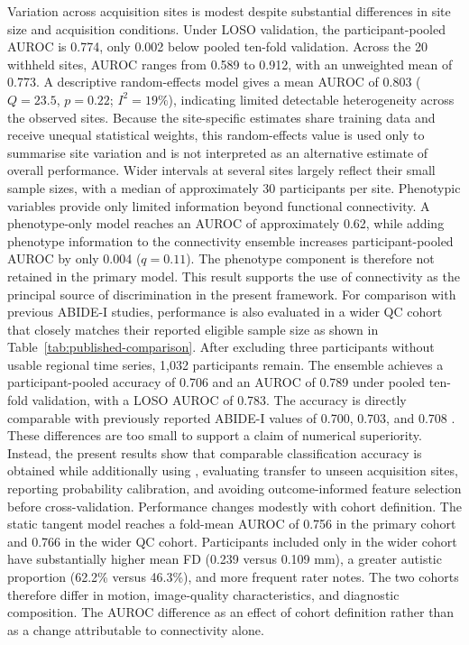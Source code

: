 Variation across acquisition sites is modest despite substantial differences in site size and acquisition conditions. Under LOSO validation, the participant-pooled AUROC is 0.774, only 0.002 below pooled ten-fold validation. Across the 20 withheld sites, AUROC ranges from 0.589 to 0.912, with an unweighted mean of 0.773. A descriptive random-effects model gives a mean AUROC of 0.803 ($Q=23.5$, $p=0.22$; $I^2=19\%$), indicating limited detectable heterogeneity across the observed sites. Because the site-specific estimates share training data and receive unequal statistical weights, this random-effects value is used only to summarise site variation and is not interpreted as an alternative estimate of overall performance. Wider intervals at several sites largely reflect their small sample sizes, with a median of approximately 30 participants per site. Phenotypic variables provide only limited information beyond functional connectivity. A phenotype-only model reaches an AUROC of approximately 0.62, while adding phenotype information to the connectivity ensemble increases participant-pooled AUROC by only 0.004 ($q=0.11$). The phenotype component is therefore not retained in the primary model. This result supports the use of connectivity as the principal source of discrimination in the present framework. For comparison with previous ABIDE-I studies, performance is also evaluated in a wider QC cohort that closely matches their reported eligible sample size as shown in Table~\ref{tab:published-comparison}. After excluding three participants without usable regional time series, 1,032 participants remain. The ensemble achieves a participant-pooled accuracy of 0.706 and an AUROC of 0.789 under pooled ten-fold validation, with a LOSO AUROC of 0.783. The accuracy is directly comparable with previously reported ABIDE-I values of 0.700, 0.703, and 0.708 \citep{Heinsfeldetal2018,Eslamietal2019,AlmuqhimSaeed2021}. These differences are too small to support a claim of numerical superiority. Instead, the present results show that comparable classification accuracy is obtained while additionally using , evaluating transfer to unseen acquisition sites, reporting probability calibration, and avoiding outcome-informed feature selection before cross-validation. Performance changes modestly with cohort definition. The static tangent model reaches a fold-mean AUROC of 0.756 in the primary cohort and 0.766 in the wider QC cohort. Participants included only in the wider cohort have substantially higher mean FD (0.239 versus 0.109 mm), a greater autistic proportion (62.2\% versus 46.3\%), and more frequent rater notes. The two cohorts therefore differ in motion, image-quality characteristics, and diagnostic composition. The AUROC difference  as an effect of cohort definition rather than as a change attributable to connectivity alone.

